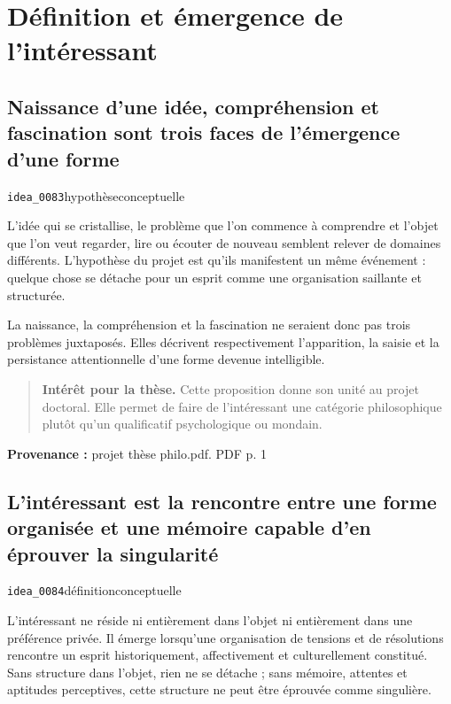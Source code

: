 \documentclass[10pt,a4paper]{article}
\begin{document}
\section{Définition et émergence de l'intéressant}

\subsection{Naissance d'une idée, compréhension et fascination sont trois faces de l'émergence d'une forme}
{\small\color{metadata} \texttt{idea\_0083}\quad\textbullet\quad hypothèse\quad\textbullet\quad conceptuelle\par}

L'idée qui se cristallise, le problème que l'on commence à comprendre et l'objet que l'on veut regarder, lire ou écouter de nouveau semblent relever de domaines différents. L'hypothèse du projet est qu'ils manifestent un même événement : quelque chose se détache pour un esprit comme une organisation saillante et structurée.

La naissance, la compréhension et la fascination ne seraient donc pas trois problèmes juxtaposés. Elles décrivent respectivement l'apparition, la saisie et la persistance attentionnelle d'une forme devenue intelligible.

\begin{quote}
\textbf{Intérêt pour la thèse.} Cette proposition donne son unité au projet doctoral. Elle permet de faire de l'intéressant une catégorie philosophique plutôt qu'un qualificatif psychologique ou mondain.
\end{quote}
{\footnotesize\color{metadata}\textbf{Provenance :} projet thèse philo.pdf. PDF p. 1\par}

\subsection{L'intéressant est la rencontre entre une forme organisée et une mémoire capable d'en éprouver la singularité}
{\small\color{metadata} \texttt{idea\_0084}\quad\textbullet\quad définition\quad\textbullet\quad conceptuelle\par}

L'intéressant ne réside ni entièrement dans l'objet ni entièrement dans une préférence privée. Il émerge lorsqu'une organisation de tensions et de résolutions rencontre un esprit historiquement, affectivement et culturellement constitué. Sans structure dans l'objet, rien ne se détache ; sans mémoire, attentes et aptitudes perceptives, cette structure ne peut être éprouvée comme singulière.
\end{document}
